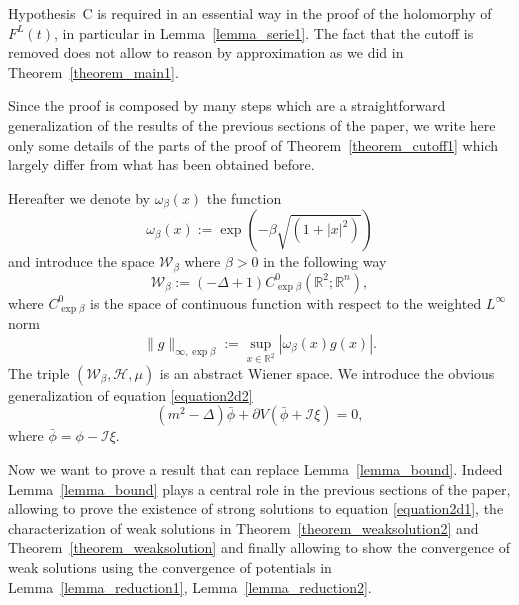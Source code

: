 \documentclass[a4paper,10pt]{article}
\newcommand{\assign}{:=}
\begin{document}
\begin{remark}
  Hypothesis~C is required in an essential way in the proof of the holomorphy
  of $F^L (t)$, in particular in Lemma~\ref{lemma_serie1}. The fact that the
  cutoff is removed does not allow to reason by approximation as we did in
  Theorem~\ref{theorem_main1}. 
\end{remark}

Since the proof is composed by many steps which are a straightforward
generalization of the results of the previous sections of the paper, we write
here only some details of the parts of the proof of
Theorem~\ref{theorem_cutoff1} which largely differ from what has been obtained
before.

Hereafter we denote by $\omega_{\beta} (x)$ the function
\[ \omega_{\beta} (x) \assign \exp (- \beta \sqrt{(1 + | x |^2)}) \]
and introduce the space $\mathcal{W}_{\beta}$ where $\beta > 0$ in the
following way
\[ \mathcal{W}_{\beta} \assign (- \Delta + 1) C^0_{\exp \beta} (\mathbb{R}^2 ;
   \mathbb{R}^n), \]
where $C^0_{\exp \beta}$ is the space of continuous function with respect to
the weighted $L^{\infty}$ norm
\[ \| g \|_{\infty, \exp \beta} \assign \sup_{x \in \mathbb{R}^2} |
   \omega_{\beta} (x) g (x) | . \]
The triple $(\mathcal{W}_{\beta}, \mathcal{H}, \mu)$ is an abstract Wiener
space. We introduce the obvious generalization of equation
{\eqref{equation2d2}}
\begin{equation}
  (m^2 - \Delta) \bar{\phi} + \partial V (\bar{\phi} +\mathcal{I} \xi) = 0,
  \label{equationcutoff2}
\end{equation}
where $\bar{\phi} = \phi -\mathcal{I} \xi .$

Now we want to prove a result that can replace Lemma~\ref{lemma_bound}.
Indeed Lemma~\ref{lemma_bound} plays a central role in the previous sections
of the paper, allowing to prove the existence of strong solutions to equation
{\eqref{equation2d1}}, the characterization of weak solutions in
Theorem~\ref{theorem_weaksolution2} and Theorem~\ref{theorem_weaksolution} and
finally allowing to show the convergence of weak solutions using the
convergence of potentials in Lemma~\ref{lemma_reduction1},
Lemma~\ref{lemma_reduction2}.
\end{document}
